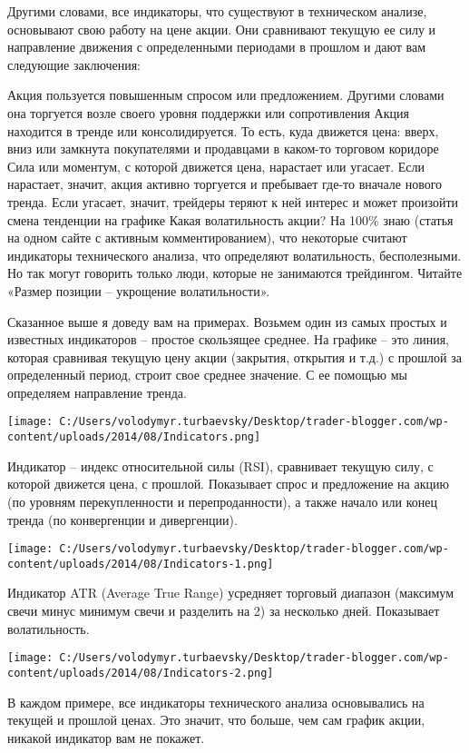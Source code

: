 \documentclass[a5paper]{article}
\begin{document}
Другими словами, все индикаторы, что существуют в техническом анализе, основывают свою работу на цене акции. Они сравнивают текущую ее силу и направление движения с определенными периодами в прошлом и дают вам следующие заключения:

    Акция пользуется повышенным спросом или предложением. Другими словами она торгуется возле своего уровня поддержки или сопротивления
    Акция находится в тренде или консолидируется. То есть, куда движется цена: вверх, вниз или замкнута покупателями и продавцами в каком-то торговом коридоре
    Сила или моментум, с которой движется цена, нарастает или угасает. Если нарастает, значит, акция активно торгуется и пребывает где-то вначале нового тренда. Если угасает, значит, трейдеры теряют к ней интерес и может произойти смена тенденции на графике
    Какая волатильность акции? На 100\% знаю (статья на одном сайте с активным комментированием), что некоторые считают индикаторы технического анализа, что определяют волатильность, бесполезными. Но так могут говорить только люди, которые не занимаются трейдингом. Читайте «Размер позиции – укрощение волатильности».

Сказанное выше я доведу вам на примерах. Возьмем один из самых простых
и известных индикаторов – простое скользящее среднее. На графике – это
линия, которая сравнивая текущую цену акции (закрытия, открытия и
т.д.) с прошлой за определенный период, строит свое среднее
значение. С ее помощью мы определяем направление тренда.

\texttt{[image: C:/Users/volodymyr.turbaevsky/Desktop/trader-blogger.com/wp-content/uploads/2014/08/Indicators.png]}

Индикатор – индекс относительной силы (RSI), сравнивает текущую силу,
с которой движется цена, с прошлой. Показывает спрос и предложение на
акцию (по уровням перекупленности и перепроданности), а также начало
или конец тренда (по конвергенции и дивергенции).

\texttt{[image: C:/Users/volodymyr.turbaevsky/Desktop/trader-blogger.com/wp-content/uploads/2014/08/Indicators-1.png]}

Индикатор ATR (Average True Range) усредняет торговый диапазон (максимум свечи минус минимум свечи и разделить на 2) за несколько дней. Показывает волатильность.

\texttt{[image: C:/Users/volodymyr.turbaevsky/Desktop/trader-blogger.com/wp-content/uploads/2014/08/Indicators-2.png]}

В каждом примере, все индикаторы технического анализа основывались на текущей и прошлой ценах. Это значит, что больше, чем сам график акции, никакой индикатор вам не покажет.
\end{document}

